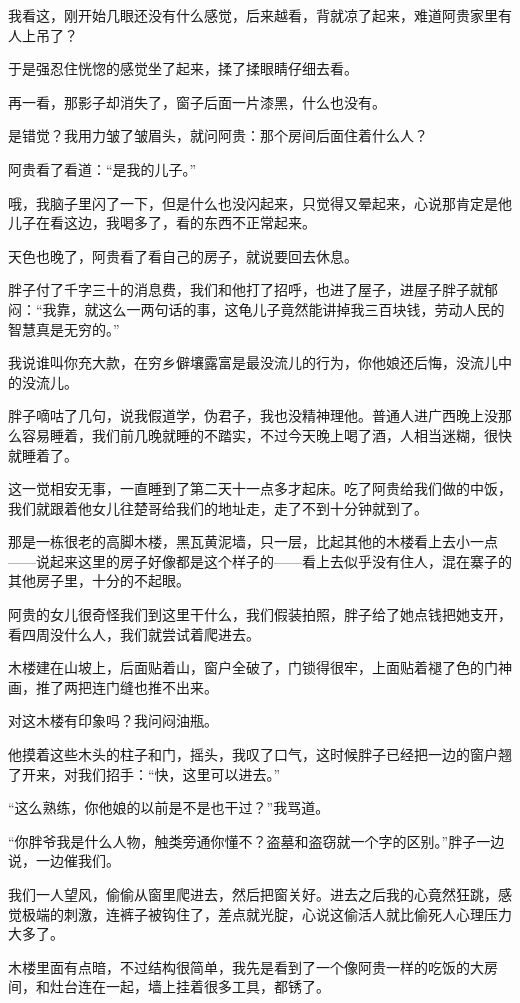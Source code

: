 我看这，刚开始几眼还没有什么感觉，后来越看，背就凉了起来，难道阿贵家里有人上吊了？

于是强忍住恍惚的感觉坐了起来，揉了揉眼睛仔细去看。

再一看，那影子却消失了，窗子后面一片漆黑，什么也没有。

是错觉？我用力皱了皱眉头，就问阿贵：那个房间后面住着什么人？

阿贵看了看道：“是我的儿子。”

哦，我脑子里闪了一下，但是什么也没闪起来，只觉得又晕起来，心说那肯定是他儿子在看这边，我喝多了，看的东西不正常起来。

天色也晚了，阿贵看了看自己的房子，就说要回去休息。

胖子付了千字三十的消息费，我们和他打了招呼，也进了屋子，进屋子胖子就郁闷：“我靠，就这么一两句话的事，这龟儿子竟然能讲掉我三百块钱，劳动人民的智慧真是无穷的。”

我说谁叫你充大款，在穷乡僻壤露富是最没流儿的行为，你他娘还后悔，没流儿中的没流儿。

胖子嘀咕了几句，说我假道学，伪君子，我也没精神理他。普通人进广西晚上没那么容易睡着，我们前几晚就睡的不踏实，不过今天晚上喝了酒，人相当迷糊，很快就睡着了。

这一觉相安无事，一直睡到了第二天十一点多才起床。吃了阿贵给我们做的中饭，我们就跟着他女儿往楚哥给我们的地址走，走了不到十分钟就到了。

那是一栋很老的高脚木楼，黑瓦黄泥墙，只一层，比起其他的木楼看上去小一点——说起来这里的房子好像都是这个样子的——看上去似乎没有住人，混在寨子的其他房子里，十分的不起眼。

阿贵的女儿很奇怪我们到这里干什么，我们假装拍照，胖子给了她点钱把她支开，看四周没什么人，我们就尝试着爬进去。

木楼建在山坡上，后面贴着山，窗户全破了，门锁得很牢，上面贴着褪了色的门神画，推了两把连门缝也推不出来。

对这木楼有印象吗？我问闷油瓶。

他摸着这些木头的柱子和门，摇头，我叹了口气，这时候胖子已经把一边的窗户翘了开来，对我们招手：“快，这里可以进去。”

“这么熟练，你他娘的以前是不是也干过？”我骂道。

“你胖爷我是什么人物，触类旁通你懂不？盗墓和盗窃就一个字的区别。”胖子一边说，一边催我们。

我们一人望风，偷偷从窗里爬进去，然后把窗关好。进去之后我的心竟然狂跳，感觉极端的刺激，连裤子被钩住了，差点就光腚，心说这偷活人就比偷死人心理压力大多了。

木楼里面有点暗，不过结构很简单，我先是看到了一个像阿贵一样的吃饭的大房间，和灶台连在一起，墙上挂着很多工具，都锈了。

